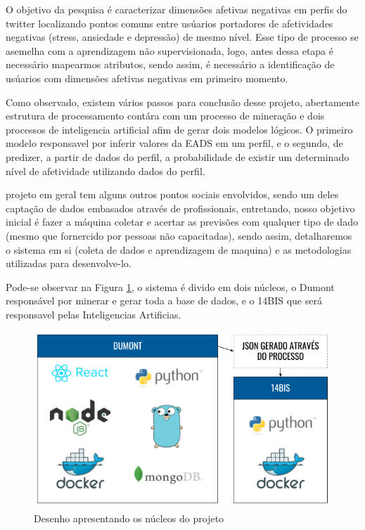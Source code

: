 O objetivo da pesquisa é caracterizar dimensões afetivas negativas em perfis do twitter localizando pontos comuns entre usúarios portadores de afetividades negativas (stress, ansiedade e depressão) de mesmo nível. Esse tipo de processo se asemelha com a aprendizagem não supervisionada, logo, antes dessa etapa é necessário mapearmos atributos, sendo assim, é necessário a identificação de usúarios com dimensões afetivas negativas em primeiro momento.

Como observado, existem vários passos para conclusão desse projeto, abertamente estrutura de processamento contára com um processo de mineração e dois processos de inteligencia artificial afim de gerar dois modelos lógicos. O primeiro modelo responsavel por inferir valores da EADS em um perfil, e o segundo, de predizer, a partir de dados do perfil, a probabilidade de existir um determinado nível de afetividade utilizando dados do perfil.

 projeto em geral tem alguns outros pontos sociais envolvidos, sendo um deles captação de dados embasados através de profissionais, entretando, nosso objetivo inicial é fazer a máquina coletar e acertar as previsões com qualquer tipo de dado (mesmo que fornercido por pessoas não capacitadas), sendo assim, detalharemos o sistema em si (coleta de dados e aprendizagem de maquina) e as metodologias utilizadas para desenvolve-lo.

Pode-se observar na Figura \ref{fig:tecnologias}, o sistema é divido em dois núcleos, o Dumont responsável por minerar e gerar toda a base de dados, e o 14BIS que será responsavel pelas Inteligencias Artificias.

\begin{figure}
    \centering
    \includegraphics[width=1\textwidth]{imagens/tecnologias.png}
    \caption{Desenho apresentando os núcleos do projeto}
    \label{fig:tecnologias}
\end{figure}

